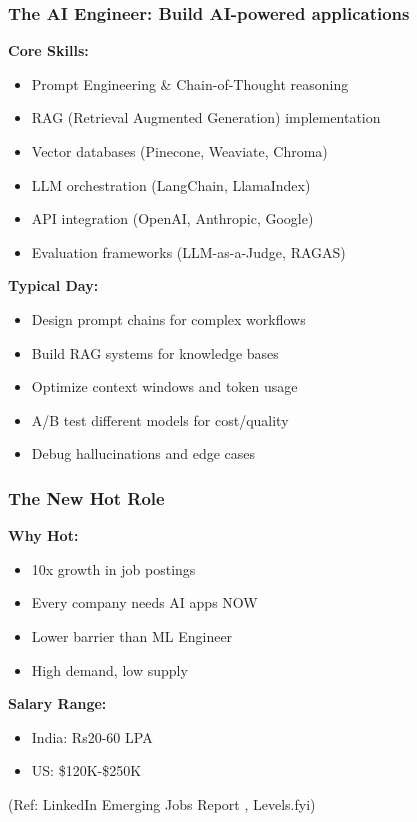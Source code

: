 \begin{frame}[fragile]\frametitle{The AI Engineer: Build AI-powered applications }

\textbf{Core Skills:}
\begin{itemize}
\item Prompt Engineering \& Chain-of-Thought reasoning
\item RAG (Retrieval Augmented Generation) implementation
\item Vector databases (Pinecone, Weaviate, Chroma)
\item LLM orchestration (LangChain, LlamaIndex)
\item API integration (OpenAI, Anthropic, Google)
\item Evaluation frameworks (LLM-as-a-Judge, RAGAS)
\end{itemize}

\textbf{Typical Day:}
\begin{itemize}
\item Design prompt chains for complex workflows
\item Build RAG systems for knowledge bases
\item Optimize context windows and token usage
\item A/B test different models for cost/quality
\item Debug hallucinations and edge cases
\end{itemize}

\end{frame}

\begin{frame}[fragile]\frametitle{The New Hot Role}
\textbf{Why Hot:}
\begin{itemize}
\item 10x growth in job postings 
\item Every company needs AI apps NOW
\item Lower barrier than ML Engineer
\item High demand, low supply
\end{itemize}

\textbf{Salary Range:}
\begin{itemize}
\item India: Rs20-60 LPA
\item US: \$120K-\$250K
\end{itemize}

{\tiny (Ref: LinkedIn Emerging Jobs Report , Levels.fyi)}

\end{frame}

